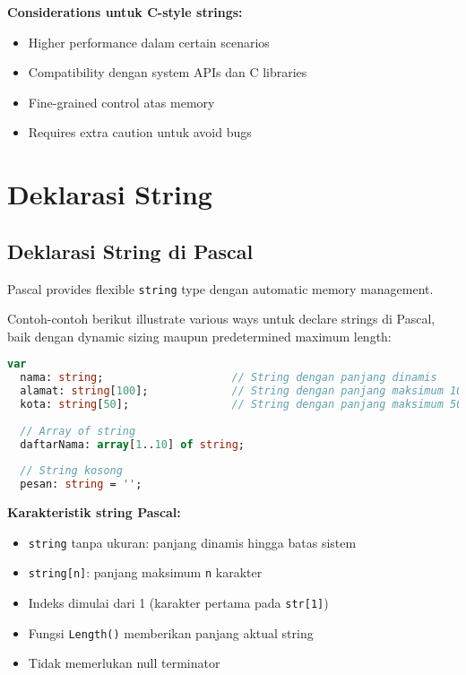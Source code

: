 \documentclass[../main.tex]{subfiles}
\begin{document}
\textbf{Considerations untuk C-style strings:}
\begin{itemize}
  \item Higher performance dalam certain scenarios
  \item Compatibility dengan system APIs dan C libraries
  \item Fine-grained control atas memory
  \item Requires extra caution untuk avoid bugs
\end{itemize}

\section{Deklarasi String}

\subsection{Deklarasi String di Pascal}

Pascal provides flexible \texttt{string} type dengan automatic memory management.

Contoh-contoh berikut illustrate various ways untuk declare strings di Pascal, baik dengan dynamic sizing maupun predetermined maximum length:

\begin{lstlisting}[language=Pascal, caption={Deklarasi string di Pascal}]
var
  nama: string;                    // String dengan panjang dinamis
  alamat: string[100];             // String dengan panjang maksimum 100
  kota: string[50];                // String dengan panjang maksimum 50
  
  // Array of string
  daftarNama: array[1..10] of string;
  
  // String kosong
  pesan: string = '';
\end{lstlisting}

\textbf{Karakteristik string Pascal:}
\begin{itemize}
  \item \texttt{string} tanpa ukuran: panjang dinamis hingga batas sistem
  \item \texttt{string[n]}: panjang maksimum \texttt{n} karakter
  \item Indeks dimulai dari 1 (karakter pertama pada \texttt{str[1]})
  \item Fungsi \texttt{Length()} memberikan panjang aktual string
  \item Tidak memerlukan null terminator
\end{itemize}
\end{document}
